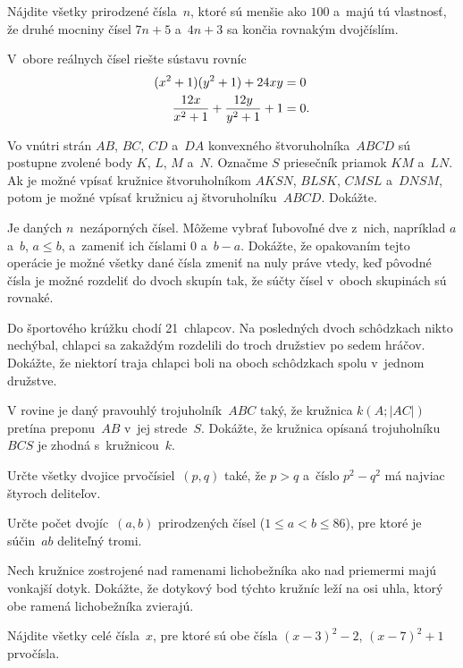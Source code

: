 {%
Nájdite všetky prirodzené čísla~$n$, ktoré sú menšie ako $100$ a~majú tú vlastnosť,
že druhé mocniny čísel $7n+5$ a~$4n+3$ sa končia rovnakým dvojčíslím.}

{%
V~obore reálnych čísel riešte sústavu rovníc
$$\aligned
(x^2+1)(y^2+1)+24xy&=0\\
\frac{12x}{x^2+1}+\frac{12y}{y^2+1}+1&=0.
\endaligned
$$
}

{%
Vo vnútri strán $AB$, $BC$, $CD$ a~$DA$ konvexného štvoruholníka~$ABCD$ sú
postupne zvolené body $K$, $L$, $M$ a~$N$. Označme $S$ priesečník priamok $KM$ a~$LN$.
Ak je možné vpísať kružnice štvoruholníkom $AKSN$, $BLSK$, $CMSL$ a~$DNSM$, potom je
možné vpísať kružnicu aj štvoruholníku~$ABCD$. Dokážte.}

{%
Je daných $n$~nezáporných čísel. Môžeme vybrať ľubovoľné dve z~nich,
napríklad $a$ a~$b$, $a\le b$, a~zameniť ich číslami $0$ a~$b-a$. Dokážte, že opakovaním
tejto operácie je možné všetky dané čísla zmeniť na nuly práve vtedy, keď pôvodné čísla
je možné rozdeliť do dvoch skupín tak, že súčty čísel v~oboch skupinách sú rovnaké.}

{%
Do športového krúžku chodí 21~chlapcov. Na posledných dvoch schôdzkach nikto nechýbal,
chlapci sa zakaždým rozdelili do troch družstiev po sedem hráčov. Dokážte, že
niektorí traja chlapci boli na oboch schôdzkach spolu v~jednom družstve.}

{%
V rovine je daný pravouhlý trojuholník~$ABC$ taký, že kružnica $k(A;|AC|)$ pretína
preponu~$AB$ v~jej strede~$S$. Dokážte, že kružnica opísaná trojuholníku~$BCS$
je zhodná s~kružnicou~$k$.}

{%
Určte všetky dvojice prvočísiel~$(p,q)$ také, že $p>q$ a~číslo $p^2-q^2$ má najviac
štyroch deliteľov.}

{%
Určte počet dvojíc~$(a,b)$ prirodzených čísel ($1\le a<b\le86$), pre ktoré je
súčin~$ab$ deliteľný tromi.}

{%
Nech kružnice zostrojené nad ramenami lichobežníka ako nad priemermi majú vonkajší dotyk.
Dokážte, že dotykový bod týchto kružníc leží na osi uhla, ktorý obe ramená
lichobežníka zvierajú.}

{%
Nájdite všetky celé čísla~$x$, pre ktoré sú obe čísla $({x-3})^2-2$, $({x-7})^2+1$ prvočísla.}

